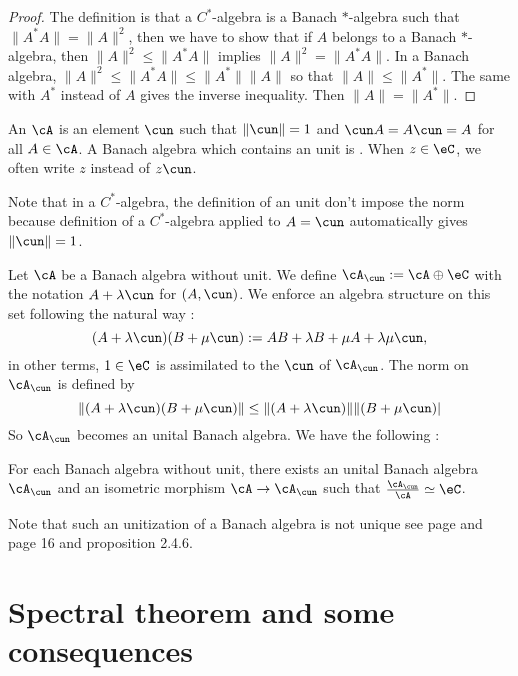 \begin{proof}
The definition is that a $C^*$-algebra is a Banach $*$-algebra such that $\|A^*A\|=\|A\|^2$, then we have to show that  if $A$ belongs to a Banach $*$-algebra, then $\|A\|^2\leq\|A^*A\|$ implies $\|A\|^2=\|A^*A\|$. In a Banach algebra, $\|A\|^2\leq\|A^*A\|\leq\|A^*\|\|A\|$ so that $\|A\|\leq\|A^*\|$. The same with $A^*$ instead of $A$ gives the inverse inequality. Then $\|A\|=\|A^*\|$.
\end{proof}

\begin{definition}
An  $\cA$ is an element $\cun$ such that $\|\cun\|=1$ and $\cun A=A\cun=A$ for all $A\in\cA$. A Banach algebra which contains an unit is . When $z\in\eC$, we often write $z$ instead of $z\cun$.
\end{definition}

Note that in a $C^*$-algebra, the definition of an unit don't impose the norm because definition of a $C^*$-algebra applied to $A=\cun$ automatically gives $\|\cun\|=1$.

Let $\cA$ be a Banach algebra without unit. We define $\cA_{\cun}:=\cA\oplus\eC$ with the notation $A+\lambda\cun$ for $(A,\cun)$. We enforce an algebra structure on this set following the natural way :
\[
  (A+\lambda\cun)(B+\mu\cun):=AB+\lambda B+\mu A+\lambda\mu\cun,
\]
in other terms, $1\in\eC$ is assimilated to the $\cun$ of $\cA_{\cun}$. The norm on $\cA_{\cun}$ is defined by
\[
   \|(A+\lambda\cun)(B+\mu\cun)\|\leq\|(A+\lambda\cun)\|\|(B+\mu\cun)|
\]
So $\cA_{\cun}$ becomes an unital Banach algebra. We have the following :

\begin{proposition}
For each Banach algebra without unit, there exists an unital Banach algebra $\cA_{\cun}$ and an isometric morphism $\cA\to\cA_{\cun}$ such that $\frac{\cA_{\cun}}{\cA}\simeq\eC$.
\end{proposition}

Note that such an unitization of a Banach algebra is not unique see page \pageref{pg:unit_nonunic} and \cite{Landsman} page 16 and proposition 2.4.6.

  
\section{Spectral theorem and some consequences}\label{pg_spectralthe}

